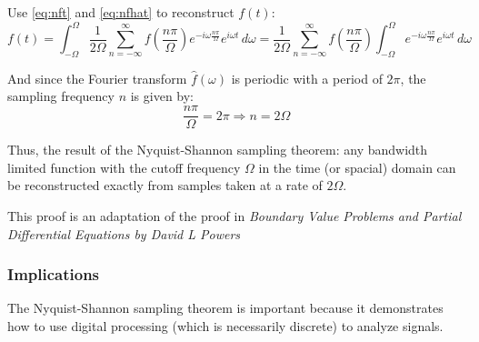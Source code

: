 \documentclass[12pt]{article}
\newcommand{\inftyint}{\int_{-\infty}^{\infty}}
\begin{document}
Use \eqref{eq:nft} and \eqref{eq:nfhat} to reconstruct \( f(t)  \):
\begin{equation}
\label{eq:ndtft}
f(t) = \int_{-\Omega}^{\Omega} \frac{1}{2\Omega} \sum_{n = -\infty}^{\infty} f(\frac{n\pi}{\Omega})e^{-i \omega \frac{n \pi}{\Omega} } e^{i\omega t} \,d\omega = \frac{1}{2\Omega} \sum_{n = -\infty}^{\infty} f(\frac{n\pi}{\Omega}) \int_{-\Omega}^{\Omega} e^{-i \omega \frac{n \pi}{\Omega} } e^{i\omega t} \, d\omega
\end{equation}

And since the Fourier transform \( \hat{f}(\omega) \) is periodic with a period of \( 2\pi\), the sampling frequency \( n\) is given by:
\[ \frac{n\pi}{\Omega} = 2\pi \Rightarrow n = 2\Omega\]

Thus, the result of the Nyquist-Shannon sampling theorem: any bandwidth limited function with the cutoff frequency \( \Omega \) in the time (or spacial) domain can be reconstructed exactly from samples taken at a rate of \( 2\Omega \).

This proof is an adaptation of the proof in \emph{Boundary Value Problems and Partial Differential Equations by David L Powers}

%
%


\subsubsection{Implications}

The Nyquist-Shannon sampling theorem is important because it demonstrates how to use digital processing (which is necessarily discrete) to analyze signals. 
\end{document}
